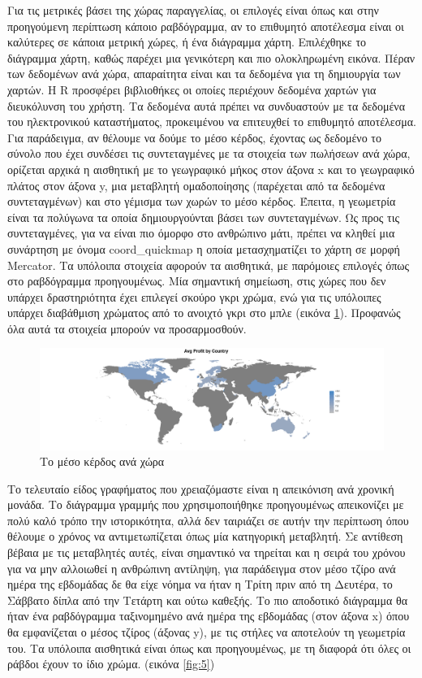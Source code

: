 \documentclass[greek, 12pt]{article}
\begin{document}
Για τις μετρικές βάσει της χώρας παραγγελίας, οι επιλογές είναι όπως και στην προηγούμενη περίπτωση κάποιο ραβδόγραμμα, αν το επιθυμητό αποτέλεσμα είναι οι καλύτερες σε κάποια μετρική χώρες, ή ένα διάγραμμα χάρτη. Επιλέχθηκε το διάγραμμα χάρτη, καθώς παρέχει μια γενικότερη και πιο ολοκληρωμένη εικόνα. Πέραν των δεδομένων ανά χώρα, απαραίτητα είναι και τα δεδομένα για τη δημιουργία των χαρτών. Η R προσφέρει βιβλιοθήκες οι οποίες περιέχουν δεδομένα χαρτών για διευκόλυνση του χρήστη. Τα δεδομένα αυτά πρέπει να συνδυαστούν με τα δεδομένα του ηλεκτρονικού καταστήματος, προκειμένου να επιτευχθεί το επιθυμητό αποτέλεσμα. Για παράδειγμα, αν θέλουμε να δούμε το μέσο κέρδος, έχοντας ως δεδομένο το σύνολο που έχει συνδέσει τις συντεταγμένες με τα στοιχεία των πωλήσεων ανά χώρα, ορίζεται αρχικά η αισθητική με το γεωγραφικό μήκος στον άξονα x και το γεωγραφικό πλάτος στον άξονα y, μια μεταβλητή ομαδοποίησης (παρέχεται από τα δεδομένα συντεταγμένων) και στο γέμισμα των χωρών το μέσο κέρδος. Έπειτα, η γεωμετρία είναι τα πολύγωνα τα οποία δημιουργούνται βάσει των συντεταγμένων. Ως προς τις συντεταγμένες, για να είναι πιο όμορφο στο ανθρώπινο μάτι, πρέπει να κληθεί μια συνάρτηση με όνομα coord\_quickmap η οποία μετασχηματίζει το χάρτη σε μορφή Mercator. Τα υπόλοιπα στοιχεία αφορούν τα αισθητικά, με παρόμοιες επιλογές όπως στο ραβδόγραμμα προηγουμένως. Μία σημαντική σημείωση, στις χώρες που δεν υπάρχει δραστηριότητα έχει επιλεγεί σκούρο γκρι χρώμα, ενώ για τις υπόλοιπες υπάρχει διαβάθμιση χρώματος από το ανοιχτό γκρι στο μπλε (εικόνα \ref{fig:4}). Προφανώς όλα αυτά τα στοιχεία μπορούν να προσαρμοσθούν.

\begin{figure}[h]
    \centering
    \includegraphics[width=\textwidth]{pictures/4_map_graph.png}
    \caption{Το μέσο κέρδος ανά χώρα}
    \label{fig:4}
\end{figure}

Το τελευταίο είδος γραφήματος που χρειαζόμαστε είναι η απεικόνιση ανά χρονική μονάδα. Το διάγραμμα γραμμής που χρησιμοποιήθηκε προηγουμένως απεικονίζει με πολύ καλό τρόπο την ιστορικότητα, αλλά δεν ταιριάζει σε αυτήν την περίπτωση όπου θέλουμε ο χρόνος να αντιμετωπίζεται όπως μία κατηγορική μεταβλητή. Σε αντίθεση βέβαια με τις μεταβλητές αυτές, είναι σημαντικό να τηρείται και η σειρά του χρόνου για να μην αλλοιωθεί η ανθρώπινη αντίληψη, για παράδειγμα στον μέσο τζίρο ανά ημέρα της εβδομάδας δε θα είχε νόημα να ήταν η Τρίτη πριν από τη Δευτέρα, το Σάββατο δίπλα από την Τετάρτη και ούτω καθεξής. Το πιο αποδοτικό διάγραμμα θα ήταν ένα ραβδόγραμμα ταξινομημένο ανά ημέρα της εβδομάδας (στον άξονα x) όπου θα εμφανίζεται ο μέσος τζίρος (άξονας y), με τις στήλες να αποτελούν τη γεωμετρία του. Τα υπόλοιπα αισθητικά είναι όπως και προηγουμένως, με τη διαφορά ότι όλες οι ράβδοι έχουν το ίδιο χρώμα. (εικόνα \ref{fig:5})
\end{document}
